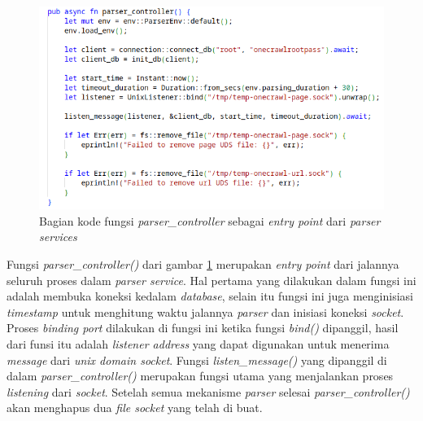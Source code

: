 \begin{figure}[H]
  \centering
  \includegraphics[keepaspectratio, width=13cm]{gambar/parser-controller-code.png}
  \caption{Bagian kode fungsi \emph{parser\_controller} sebagai \emph{entry point} dari \emph{parser services}}
  \label{gambar:parser-controller}
\end{figure}

Fungsi \emph{parser\_controller()} dari gambar \ref{gambar:parser-controller} merupakan \emph{entry point} dari jalannya seluruh proses dalam \emph{parser service}. Hal pertama yang dilakukan dalam fungsi ini adalah membuka koneksi kedalam \emph{database}, selain itu fungsi ini juga menginisiasi \emph{timestamp} untuk menghitung waktu jalannya \emph{parser} dan inisiasi koneksi \emph{socket}. Proses \emph{binding port} dilakukan di fungsi ini ketika fungsi \emph{bind()} dipanggil, hasil dari funsi itu adalah \emph{listener address} yang dapat digunakan untuk menerima \emph{message} dari \emph{unix domain socket}. Fungsi \emph{listen\_message()} yang dipanggil di dalam \emph{parser\_controller()} merupakan fungsi utama yang menjalankan proses \emph{listening} dari \emph{socket}. Setelah semua mekanisme \emph{parser} selesai \emph{parser\_controller()} akan menghapus dua \emph{file socket} yang telah di buat.

